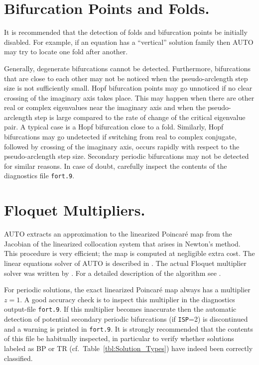 \documentclass[12pt]{report}
\begin{document}
\section{ Bifurcation Points and Folds.} \label{sec:Bifurcations}
It is recommended that the detection of folds 
and bifurcation points be initially disabled.
For example, if an equation has a ``vertical'' solution family
then {\cal AUTO} may try to locate one fold after another.

Generally, degenerate bifurcations cannot be detected.
Furthermore, bifurcations that are close to each other may not
be noticed when the pseudo-arclength step size is not sufficiently small.
Hopf bifurcation points may go unnoticed if no clear crossing of
the imaginary axis takes place. This may happen when there are other
real or complex eigenvalues near the imaginary axis and when 
the pseudo-arclength step is large compared to the rate
of change of the critical eigenvalue pair.
A typical  case is a Hopf bifurcation close to a fold.
Similarly, Hopf bifurcations may go undetected if switching from
real to complex conjugate, followed by crossing of the imaginary
axis, occurs rapidly with respect to the pseudo-arclength step size.
Secondary periodic bifurcations may not be detected for similar reasons.
In case of doubt, carefully inspect the contents of the diagnostics file
{\tt fort.9}.
 
\section{ Floquet Multipliers.} \label{sec:Floquet_multipliers}

{\cal AUTO} extracts an approximation to the linearized Poincar\'e map from 
the Jacobian of the linearized collocation system that arises in Newton's method.
This procedure is very efficient; the map is computed at negligible extra cost.
The linear equations solver of {\cal AUTO} is described in 
 \citeyear{DoKeKe:91b}.
The actual Floquet multiplier solver was written by
 \citeyear{Fa:94}.
For a detailed description of the algorithm see 
 \citeyear{FaJe:91}.

For periodic solutions, the exact linearized Poincar\'e map always has 
a multiplier $z=1$.
A good accuracy check is to inspect this 
multiplier in the diagnostics output-file {\tt fort.9}.
If this multiplier becomes inaccurate then the automatic detection 
of potential secondary periodic bifurcations (if {\tt ISP}=2) is discontinued 
and a warning is printed in {\tt fort.9}.
It is strongly recommended that the contents of this file be habitually inspected,
in particular to verify whether solutions labeled as BP or TR 
(cf.~Table~\ref{tbl:Solution_Types}) have indeed  been correctly classified.
 
\end{document}
